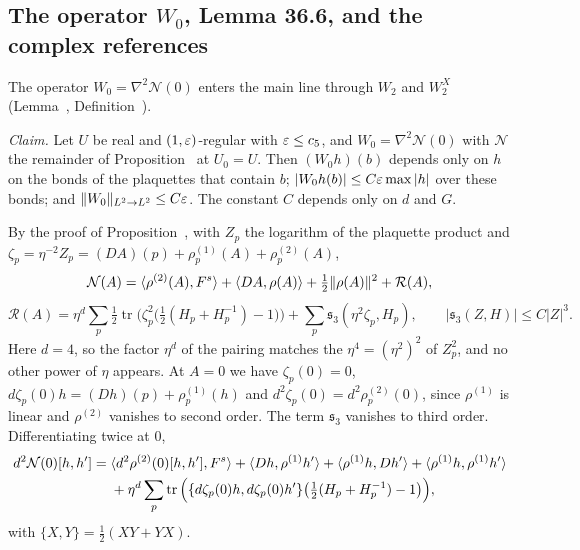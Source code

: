 \subsection{The operator \texorpdfstring{$W_0$}{W0}, Lemma 36.6, and the complex references}\label{d8:W0}

The operator $W_0=\nabla^2\mathcal N(0)$ enters the main line through $W_2$ and $W_2^X$ (Lemma~, Definition~).

\begin{detail}\label{d8:W0real}
\emph{Claim.} Let $U$ be real and $(1,\varepsilon)$-regular with $\varepsilon\le c_5$, and $W_0=\nabla^2\mathcal N(0)$ with $\mathcal N$ the remainder of Proposition~ at $U_0=U$. Then $(W_0h)(b)$ depends only on $h$ on the bonds of the plaquettes that contain $b$; $|W_0h(b)|\le C\varepsilon\max|h|$ over these bonds; and $\|W_0\|_{L^2\to L^2}\le C\varepsilon$. The constant $C$ depends only on $d$ and $G$.

\begin{step}
By the proof of Proposition~, with $Z_p$ the logarithm of the plaquette product  and $\zeta_p=\eta^{-2}Z_p=(DA)(p)+\rho^{(1)}_p(A)+\rho^{(2)}_p(A)$,
\[
\mathcal N(A)=\langle \rho^{(2)}(A),F^s\rangle+\langle DA,\rho(A)\rangle+\tfrac12\|\rho(A)\|^2+\mathcal R(A),
\]
\[
\mathcal R(A)=\eta^d\sum_p\tfrac12\operatorname{tr}\Big(\zeta_p^2\big(\tfrac12(H_p+H_p^{-1})-1\big)\Big)+\sum_p\mathfrak s_3(\eta^2\zeta_p,H_p),\qquad|\mathfrak s_3(Z,H)|\le C|Z|^3 .
\]
Here $d=4$, so the factor $\eta^d$ of the pairing matches the $\eta^4=(\eta^2)^2$ of $Z_p^2$, and no other power of $\eta$ appears. At $A=0$ we have $\zeta_p(0)=0$, $d\zeta_p(0)h=(Dh)(p)+\rho^{(1)}_p(h)$ and $d^2\zeta_p(0)=d^2\rho^{(2)}_p(0)$, since $\rho^{(1)}$ is linear and $\rho^{(2)}$ vanishes to second order. The term $\mathfrak s_3$ vanishes to third order. Differentiating twice at $0$,
\begin{equation}\label{d8:eq:W0}
\begin{aligned}
d^2\mathcal N(0)[h,h']={}&\langle d^2\rho^{(2)}(0)[h,h'],F^s\rangle+\langle Dh,\rho^{(1)}h'\rangle+\langle \rho^{(1)}h,Dh'\rangle+\langle \rho^{(1)}h,\rho^{(1)}h'\rangle\\
&+\eta^d\sum_p\operatorname{tr}\Big(\{d\zeta_p(0)h,d\zeta_p(0)h'\}\big(\tfrac12(H_p+H_p^{-1})-1\big)\Big),
\end{aligned}
\end{equation}
with $\{X,Y\}=\frac12(XY+YX)$.
\end{step}


\end{detail}
